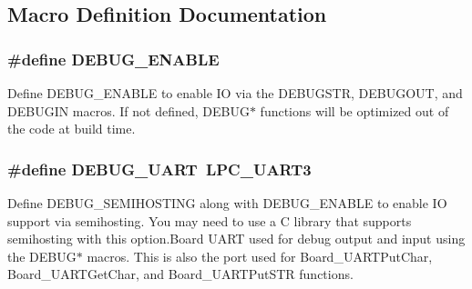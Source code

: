 \subsection{Macro Definition Documentation}
\hypertarget{group___b_o_a_r_d___n_x_p___l_p_c_x_p_r_e_s_s_o__1769___o_p_t_i_o_n_s_ga92f1452fef4b184124fa2334beb53a60}{
\subsubsection[{D\+E\+B\+U\+G\+\_\+\+E\+N\+A\+B\+L\+E}]{\setlength{\rightskip}{0pt plus 5cm}\#define D\+E\+B\+U\+G\+\_\+\+E\+N\+A\+B\+L\+E}}\label{group___b_o_a_r_d___n_x_p___l_p_c_x_p_r_e_s_s_o__1769___o_p_t_i_o_n_s_ga92f1452fef4b184124fa2334beb53a60}
Define D\+E\+B\+U\+G\+\_\+\+E\+N\+A\+B\+L\+E to enable I\+O via the D\+E\+B\+U\+G\+S\+T\+R, D\+E\+B\+U\+G\+O\+U\+T, and D\+E\+B\+U\+G\+I\+N macros. If not defined, D\+E\+B\+U\+G$\ast$ functions will be optimized out of the code at build time. \hypertarget{group___b_o_a_r_d___n_x_p___l_p_c_x_p_r_e_s_s_o__1769___o_p_t_i_o_n_s_gace21428290f0e412332701391f825a10}{
\subsubsection[{D\+E\+B\+U\+G\+\_\+\+U\+A\+R\+T}]{\setlength{\rightskip}{0pt plus 5cm}\#define D\+E\+B\+U\+G\+\_\+\+U\+A\+R\+T~L\+P\+C\+\_\+\+U\+A\+R\+T3}}\label{group___b_o_a_r_d___n_x_p___l_p_c_x_p_r_e_s_s_o__1769___o_p_t_i_o_n_s_gace21428290f0e412332701391f825a10}
Define D\+E\+B\+U\+G\+\_\+\+S\+E\+M\+I\+H\+O\+S\+T\+I\+N\+G along with D\+E\+B\+U\+G\+\_\+\+E\+N\+A\+B\+L\+E to enable I\+O support via semihosting. You may need to use a C library that supports semihosting with this option.\+Board U\+A\+R\+T used for debug output and input using the D\+E\+B\+U\+G$\ast$ macros. This is also the port used for Board\+\_\+\+U\+A\+R\+T\+Put\+Char, Board\+\_\+\+U\+A\+R\+T\+Get\+Char, and Board\+\_\+\+U\+A\+R\+T\+Put\+S\+T\+R functions. 